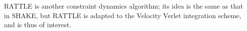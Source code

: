 \par RATTLE is another constraint dynamics algorithm; its idea is the same as that in SHAKE, but RATTLE is adapted to the Velocity Verlet integration scheme, and is thus of interest.
